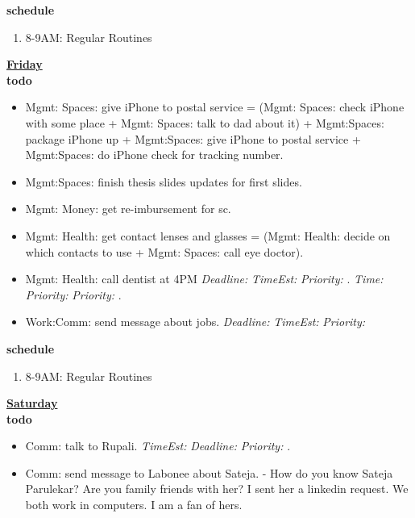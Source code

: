 \documentclass[11pt]{article}
\newcommand{\timeEst}[1]{\textit{Time:} \textit{#1}}
\newcommand{\te}[1]{\textit{TimeEst:} \textit{#1}}
\newcommand{\priority}[1]{\textit{Priority:} \textit{#1}}
\newcommand{\pr}[1]{\textit{Priority:} \textit{#1}}
\newcommand{\deadline}[1]{#1}
\newcommand{\dl}[1]{\textit{Deadline:}#1}
\begin{document}
{  \textbf{\small schedule} \\
  \begin{enumerate}
    \tiny \item \tiny 8-9AM: Regular Routines 
  \end{enumerate} 

  \textbf{\small \underline{Friday}} \\
  \textbf{\small todo} \\
  \begin{itemize} 
  \item \tiny Mgmt: Spaces: give iPhone to postal service = (Mgmt:
    Spaces: check iPhone with some place + Mgmt: Spaces: talk to dad
    about it) + Mgmt:Spaces: package iPhone up + Mgmt:Spaces: give 
    iPhone to postal service + Mgmt:Spaces: do iPhone check for
    tracking number. 

  \item \tiny Mgmt:Spaces: finish thesis slides updates for first slides.  


  \item \tiny Mgmt: Money: get re-imbursement for sc. 
  \item \tiny Mgmt: Health: get contact lenses and glasses  = (Mgmt:
    Health: decide on which contacts to use + Mgmt: Spaces: call eye
    doctor). 
  \item \tiny Mgmt: Health: call dentist at 4PM \dl{} \te{} \pr{}. 
    \deadline{} \timeEst{} \priority{} 
    \pr{}. 
  \item \tiny Work:Comm: send message about jobs.   \dl{} \te{} \pr{} 
  \end{itemize} 
  \textbf{\small schedule} \\
  \begin{enumerate}
    \tiny \item \tiny 8-9AM: Regular Routines 
  \end{enumerate} 

  \textbf{\small \underline{Saturday}} \\
  \textbf{\small todo} \\
  \begin{itemize} 



\item \tiny Comm: talk to Rupali. \te{} \dl{} \pr{}. 


  \item \tiny Comm: send message to Labonee about Sateja. - How do you
    know Sateja Parulekar? Are you family friends with her? I sent her
    a linkedin request. We both work in computers. I am a fan of hers.


\end{itemize}}
\end{document}
